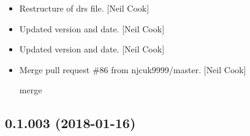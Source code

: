 \documentclass[a4paper,10pt,english]{report}
\begin{document}
\begin{itemize}
\item {} 
Restructure of drs file. {[}Neil Cook{]}

\item {} 
Updated version and date. {[}Neil Cook{]}

\item {} 
Updated version and date. {[}Neil Cook{]}

\item {} 
Merge pull request \#86 from njcuk9999/master. {[}Neil Cook{]}

merge

\end{itemize}


\subsection{0.1.003 (2018-01-16)}
\end{document}
